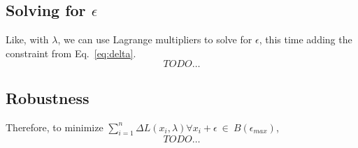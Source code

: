 \documentclass[conference]{IEEEtran}
\begin{document}





\subsection{Solving for $\epsilon$}

Like, with $\lambda$, we can use Lagrange multipliers to solve for $\epsilon$, this time adding the constraint from Eq.~\ref{eq:delta}. 
$$
TODO\dots
$$

\subsection{Robustness}

 Therefore, to minimize  $\sum_{i=1}^n \Delta L(x_i, \lambda) \forall{x_i + \epsilon}~\in~B(\epsilon_{max})$,
$$
TODO\dots
$$
\end{document}
